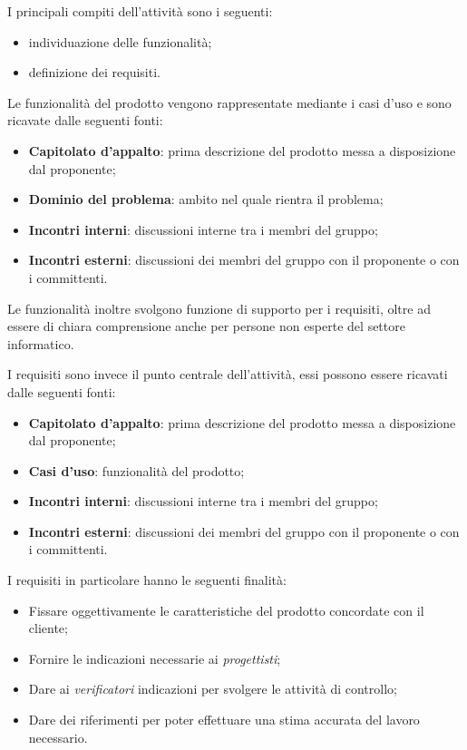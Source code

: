 I principali compiti dell'attività sono i seguenti:
\begin{itemize}
	\item individuazione delle funzionalità;
	\item definizione dei requisiti.
\end{itemize}

Le funzionalità del prodotto vengono rappresentate mediante i casi d'uso e sono ricavate dalle seguenti fonti:
\begin{itemize}
    \item \textbf{Capitolato d'appalto}: prima descrizione del prodotto messa a disposizione dal proponente;
    \item \textbf{Dominio del problema}: ambito nel quale rientra il problema;
    \item \textbf{Incontri interni}: discussioni interne tra i membri del gruppo;
    \item \textbf{Incontri esterni}: discussioni dei membri del gruppo con il proponente o con i committenti.
\end{itemize}
Le funzionalità inoltre svolgono funzione di supporto per i requisiti, oltre ad essere
di chiara comprensione anche per persone non esperte del settore informatico.

I requisiti sono invece il punto centrale dell'attività, essi possono essere ricavati dalle seguenti fonti:
\begin{itemize}
    \item \textbf{Capitolato d'appalto}: prima descrizione del prodotto messa a disposizione dal proponente;
    \item \textbf{Casi d'uso}: funzionalità del prodotto;
    \item \textbf{Incontri interni}: discussioni interne tra i membri del gruppo;
    \item \textbf{Incontri esterni}: discussioni dei membri del gruppo con il proponente o con i committenti.
\end{itemize}

I requisiti in particolare hanno le seguenti finalità:
\begin{itemize}
    \item Fissare oggettivamente le caratteristiche del prodotto concordate con il cliente;
    \item Fornire le indicazioni necessarie ai \emph{progettisti};
    \item Dare ai \emph{verificatori} indicazioni per svolgere le attività di controllo;
    \item Dare dei riferimenti per poter effettuare una stima accurata del lavoro necessario.
\end{itemize}

